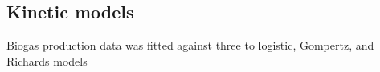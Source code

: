 \subsection{Kinetic models}
Biogas production data was fitted against three to logistic, Gompertz, and
Richards models